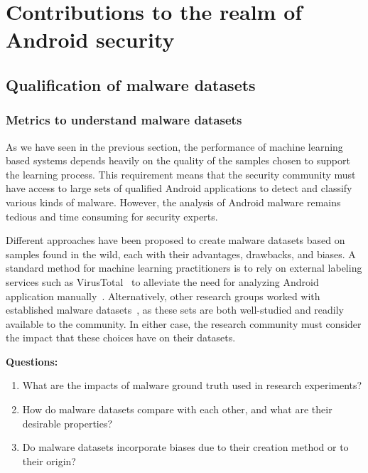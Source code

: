 \section{Contributions to the realm of Android security}
\subsection{Qualification of malware datasets}
\subsubsection{Metrics to understand malware datasets}
As we have seen in the previous section, the performance of machine learning based systems depends heavily on the quality of the samples chosen to support the learning process.
This requirement means that the security community must have access to large sets of qualified Android applications to detect and classify various kinds of malware.
However, the analysis of Android malware remains tedious and time consuming for security experts.

Different approaches have been proposed to create malware datasets based on samples found in the wild, each with their advantages, drawbacks, and biases.
A standard method for machine learning practitioners is to rely on external labeling services such as VirusTotal~\cite{noauthor_virustotal_nodate} to alleviate the need for analyzing Android application manually~\cite{arp_drebin:_2014}.
Alternatively, other research groups worked with established malware datasets~\cite{zhou_dissecting_2012}, as these sets are both well-studied and readily available to the community.
In either case, the research community must consider the impact that these choices have on their datasets.

\begin{mdframed}[hidealllines=true,nobreak=true]
\textbf{Questions:}

\begin{enumerate}
	\item What are the impacts of malware ground truth used in research experiments?
	\item How do malware datasets compare with each other, and what are their desirable properties?
	\item Do malware datasets incorporate biases due to their creation method or to their origin?
\end{enumerate}
\end{mdframed}

